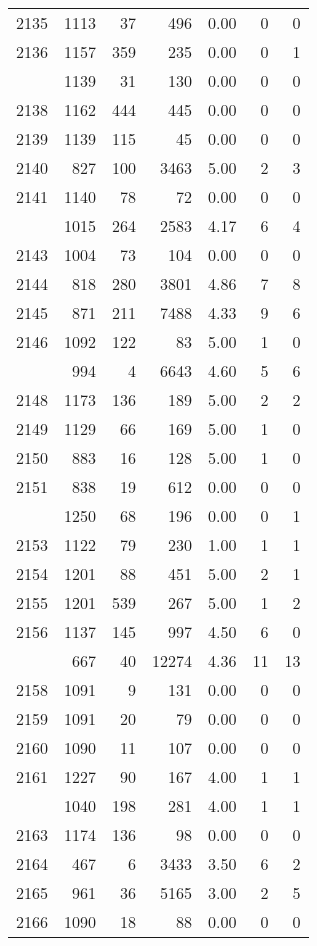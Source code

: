 \documentclass[
]{article}
\begin{document}
\begin{table}
\begin{tabular}[t]{lrrrrrr}
2135 & 1113 & 37 & 496 & 0.00 & 0 & 0\\
2136 & 1157 & 359 & 235 & 0.00 & 0 & 1\\
\addlinespace
2137 & 1139 & 31 & 130 & 0.00 & 0 & 0\\
2138 & 1162 & 444 & 445 & 0.00 & 0 & 0\\
2139 & 1139 & 115 & 45 & 0.00 & 0 & 0\\
2140 & 827 & 100 & 3463 & 5.00 & 2 & 3\\
2141 & 1140 & 78 & 72 & 0.00 & 0 & 0\\
\addlinespace
2142 & 1015 & 264 & 2583 & 4.17 & 6 & 4\\
2143 & 1004 & 73 & 104 & 0.00 & 0 & 0\\
2144 & 818 & 280 & 3801 & 4.86 & 7 & 8\\
2145 & 871 & 211 & 7488 & 4.33 & 9 & 6\\
2146 & 1092 & 122 & 83 & 5.00 & 1 & 0\\
\addlinespace
2147 & 994 & 4 & 6643 & 4.60 & 5 & 6\\
2148 & 1173 & 136 & 189 & 5.00 & 2 & 2\\
2149 & 1129 & 66 & 169 & 5.00 & 1 & 0\\
2150 & 883 & 16 & 128 & 5.00 & 1 & 0\\
2151 & 838 & 19 & 612 & 0.00 & 0 & 0\\
\addlinespace
2152 & 1250 & 68 & 196 & 0.00 & 0 & 1\\
2153 & 1122 & 79 & 230 & 1.00 & 1 & 1\\
2154 & 1201 & 88 & 451 & 5.00 & 2 & 1\\
2155 & 1201 & 539 & 267 & 5.00 & 1 & 2\\
2156 & 1137 & 145 & 997 & 4.50 & 6 & 0\\
\addlinespace
2157 & 667 & 40 & 12274 & 4.36 & 11 & 13\\
2158 & 1091 & 9 & 131 & 0.00 & 0 & 0\\
2159 & 1091 & 20 & 79 & 0.00 & 0 & 0\\
2160 & 1090 & 11 & 107 & 0.00 & 0 & 0\\
2161 & 1227 & 90 & 167 & 4.00 & 1 & 1\\
\addlinespace
2162 & 1040 & 198 & 281 & 4.00 & 1 & 1\\
2163 & 1174 & 136 & 98 & 0.00 & 0 & 0\\
2164 & 467 & 6 & 3433 & 3.50 & 6 & 2\\
2165 & 961 & 36 & 5165 & 3.00 & 2 & 5\\
2166 & 1090 & 18 & 88 & 0.00 & 0 & 0\\

\end{tabular}
\end{table}
\end{document}
